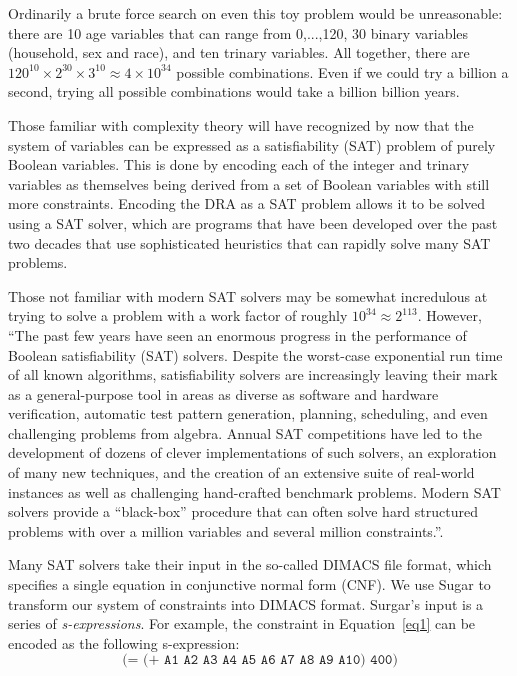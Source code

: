 \documentclass[runningheads]{llncs}
\newcommand{\citelong}[1]{}
\newcommand{\citelong}[1]{\cite{#1}}
\begin{document}
Ordinarily a brute force search on even this toy problem would be
unreasonable: there are 10 age variables that can range from 0,...,120,
30 binary variables (household, sex and race), and ten trinary
variables. All together, there are $120^{10} \times 2^{30} \times
3^{10} \approx 4 \times 10^{34}$ possible combinations. Even if we
could try a billion a second, trying all possible combinations would
take a billion billion years.

Those familiar with complexity theory will have recognized by now that
the system of variables can be expressed as a satisfiability (SAT)
problem of purely Boolean variables. This is done by encoding each of the
integer and trinary variables as themselves being derived
from a set of Boolean variables with still more constraints. Encoding
the DRA as a SAT problem allows it to be solved using a SAT solver, which are 
programs that have been developed over the past two
decades that use sophisticated heuristics that can rapidly solve many
SAT problems.

Those not familiar with modern SAT solvers may be somewhat
incredulous at trying to  solve
a problem with a work factor of roughly $10^{34}\approx2^{113}$.
However, ``The past few years have seen an enormous progress in the performance
of Boolean satisfiability (SAT) solvers. Despite the worst-case
exponential run time of all known algorithms, satisfiability solvers
are increasingly leaving their mark as a general-purpose tool in areas
as diverse as software and hardware verification,
automatic test pattern generation, planning,
scheduling, and even challenging problems from algebra. Annual SAT
competitions have led to the development of dozens
of clever implementations of such solvers, an exploration of many new
techniques, and the creation of an extensive suite of real-world
instances as well as challenging hand-crafted benchmark
problems. Modern SAT solvers provide a ``black-box'' procedure that
can often solve hard structured problems with over a million variables and
several million constraints.''\cite[references omitted]{Gomes200889}.

Many SAT solvers take their input in the so-called DIMACS file format,
which specifies a single equation in conjunctive normal form (CNF). We use
Sugar\cite{sugar} to transform our system of constraints into DIMACS
format. Surgar's input is a series of
\textit{s-expressions}\citelong{McCarthy:1960:RFS:367177.367199}. For
example, the constraint in Equation~\ref{eq1} can be encoded as the following
s-expression:
\begin{equation}
\texttt{(= (+ A1 A2 A3 A4 A5 A6 A7 A8 A9 A10) 400)}
\end{equation}
\end{document}
